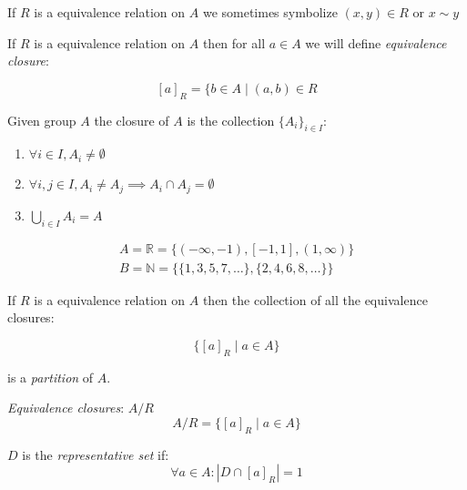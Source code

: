 \documentclass[00_complete]{subfiles}
\begin{document}
\begin{symbols}
If $R$ is a equivalence relation on $A$ we sometimes symbolize $(x,y) \in R$ or
$x \sim y$
\end{symbols}

\begin{definition}
If $R$ is a equivalence relation on $A$ then for all $a \in A$ we will define
\emph{equivalence closure}:

$$[a]_R = \{b \in A \mid (a,b) \in R$$

Given group $A$ the closure of $A$ is the collection $\{A_i\}_{i \in I}$:
\begin{enumerate}
\item $\forall i \in I, A_i \neq \emptyset$
\item $\forall i,j \in I, A_i \neq A_j \implies A_i \cap A_j = \emptyset$
\item $\displaystyle \bigcup_{i \in I}A_i=A$
\end{enumerate}
\end{definition}

\begin{example}
$$
\begin{gathered}
    A = \mathbb{R} = \{(-\infty, -1), [-1,1], (1,\infty)\} \\
    B = \mathbb{N} = \{\{1,3,5,7,\ldots\},\{2,4,6,8,\ldots\}\}
\end{gathered}
$$
\end{example}

\begin{claim}
If $R$ is a equivalence relation on $A$ then the collection of all the
equivalence closures:

$$\{[a]_R \mid a \in A \}$$

is a \emph{partition} of $A$.
\end{claim}

\begin{symbols}
\emph{Equivalence closures}: $A/R$
$$A/R  = \{[a]_R \mid a \in A\}$$

$D$ is the \emph{representative set} if:
$$\forall a \in A: |D \cap [a]_R| = 1$$
\end{symbols}
\end{document}

